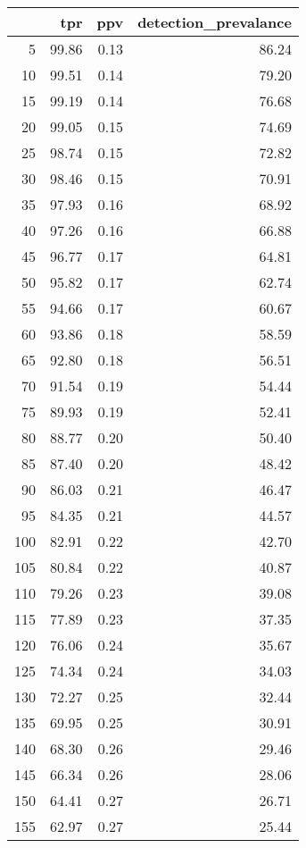 \begin{table}[ht]
\centering
\begin{tabular}{rrrr}
  \hline
 & tpr & ppv & detection\_prevalance \\ 
  \hline
    5 & 99.86 & 0.13 & 86.24 \\ 
     10 & 99.51 & 0.14 & 79.20 \\ 
     15 & 99.19 & 0.14 & 76.68 \\ 
     20 & 99.05 & 0.15 & 74.69 \\ 
     25 & 98.74 & 0.15 & 72.82 \\ 
     30 & 98.46 & 0.15 & 70.91 \\ 
     35 & 97.93 & 0.16 & 68.92 \\ 
     40 & 97.26 & 0.16 & 66.88 \\ 
     45 & 96.77 & 0.17 & 64.81 \\ 
     50 & 95.82 & 0.17 & 62.74 \\ 
     55 & 94.66 & 0.17 & 60.67 \\ 
     60 & 93.86 & 0.18 & 58.59 \\ 
     65 & 92.80 & 0.18 & 56.51 \\ 
     70 & 91.54 & 0.19 & 54.44 \\ 
     75 & 89.93 & 0.19 & 52.41 \\ 
     80 & 88.77 & 0.20 & 50.40 \\ 
     85 & 87.40 & 0.20 & 48.42 \\ 
     90 & 86.03 & 0.21 & 46.47 \\ 
     95 & 84.35 & 0.21 & 44.57 \\ 
    100 & 82.91 & 0.22 & 42.70 \\ 
    105 & 80.84 & 0.22 & 40.87 \\ 
    110 & 79.26 & 0.23 & 39.08 \\ 
    115 & 77.89 & 0.23 & 37.35 \\ 
    120 & 76.06 & 0.24 & 35.67 \\ 
    125 & 74.34 & 0.24 & 34.03 \\ 
    130 & 72.27 & 0.25 & 32.44 \\ 
    135 & 69.95 & 0.25 & 30.91 \\ 
    140 & 68.30 & 0.26 & 29.46 \\ 
    145 & 66.34 & 0.26 & 28.06 \\ 
    150 & 64.41 & 0.27 & 26.71 \\ 
    155 & 62.97 & 0.27 & 25.44 \\ 

\end{tabular}
\end{table}
